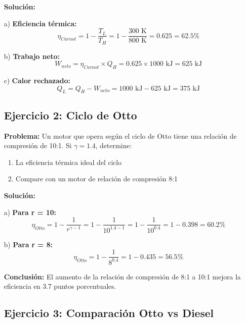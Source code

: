 \documentclass{article}
\begin{document}
    \textbf{Solución:}

    a) \textbf{Eficiencia térmica:}
    \begin{equation}
    \eta_{Carnot} = 1 - \frac{T_L}{T_H} = 1 - \frac{300\text{ K}}{800\text{ K}} = 0.625 = 62.5\%
    \end{equation}

    b) \textbf{Trabajo neto:}
    \begin{equation}
    W_{neto} = \eta_{Carnot} \times Q_H = 0.625 \times 1000\text{ kJ} = 625\text{ kJ}
    \end{equation}

    c) \textbf{Calor rechazado:}
    \begin{equation}
    Q_L = Q_H - W_{neto} = 1000\text{ kJ} - 625\text{ kJ} = 375\text{ kJ}
    \end{equation}

    \subsection{Ejercicio 2: Ciclo de Otto}

    \textbf{Problema:} Un motor que opera según el ciclo de Otto tiene una relación de compresión de 10:1. Si $\gamma = 1.4$, determine:
    \begin{enumerate}
        \item La eficiencia térmica ideal del ciclo
        \item Compare con un motor de relación de compresión 8:1
    \end{enumerate}

    \textbf{Solución:}

    a) \textbf{Para r = 10:}
    \begin{equation}
    \eta_{Otto} = 1 - \frac{1}{r^{\gamma-1}} = 1 - \frac{1}{10^{1.4-1}} = 1 - \frac{1}{10^{0.4}} = 1 - 0.398 = 60.2\%
    \end{equation}

    b) \textbf{Para r = 8:}
    \begin{equation}
    \eta_{Otto} = 1 - \frac{1}{8^{0.4}} = 1 - 0.435 = 56.5\%
    \end{equation}

    \textbf{Conclusión:} El aumento de la relación de compresión de 8:1 a 10:1 mejora la eficiencia en 3.7 puntos porcentuales.

    \subsection{Ejercicio 3: Comparación Otto vs Diesel}
\end{document}
